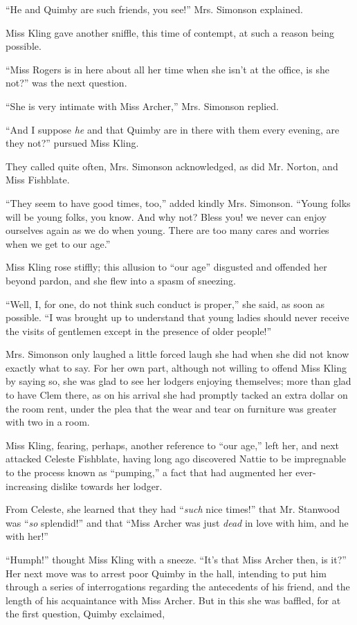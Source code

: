 ``He and Quimby are such friends, you see!'' Mrs. Simonson explained.

Miss Kling gave another sniffle, this time of contempt, at such a reason
being possible.

``Miss Rogers is in here about all her time when she isn't at the office,
is she not?'' was the next question.

``She is very intimate with Miss Archer,'' Mrs. Simonson replied.

``And I suppose \emph{he} and that Quimby are in there with them every evening,
are they not?'' pursued Miss Kling.

They called quite often, Mrs. Simonson acknowledged, as did Mr. Norton,
and Miss Fishblate.

``They seem to have good times, too,'' added kindly Mrs. Simonson. ``Young
folks will be young folks, you know. And why not? Bless you! we never
can enjoy ourselves again as we do when young. There are too many cares
and worries when we get to our age.''

Miss Kling rose stiffly; this allusion to ``our age'' disgusted and
offended her beyond pardon, and she flew into a spasm of sneezing.

``Well, I, for one, do not think such conduct is proper,'' she said, as
soon as possible. ``I was brought up to understand that young ladies
should never receive the visits of gentlemen except in the presence of
older people!''

Mrs. Simonson only laughed a little forced laugh she had when she did
not know exactly what to say. For her own part, although not willing to
offend Miss Kling by saying so, she was glad to see her lodgers enjoying
themselves; more than glad to have Clem there, as on his arrival she had
promptly tacked an extra dollar on the room rent, under the plea that
the wear and tear on furniture was greater with two in a room.

Miss Kling, fearing, perhaps, another reference to ``our age,'' left her,
and next attacked Celeste Fishblate, having long ago discovered Nattie
to be impregnable to the process known as ``pumping,'' a fact that had
augmented her ever-increasing dislike towards her lodger.

From Celeste, she learned that they had ``\emph{such} nice times!'' that Mr.
Stanwood was ``\emph{so} splendid!'' and that ``Miss Archer was just \emph{dead} in
love with him, and he with her!''

``Humph!'' thought Miss Kling with a sneeze. ``It's that Miss Archer then,
is it?'' Her next move was to arrest poor Quimby in the hall, intending
to put him through a series of interrogations regarding the antecedents
of his friend, and the length of his acquaintance with Miss Archer. But
in this she was baffled, for at the first question, Quimby exclaimed,

